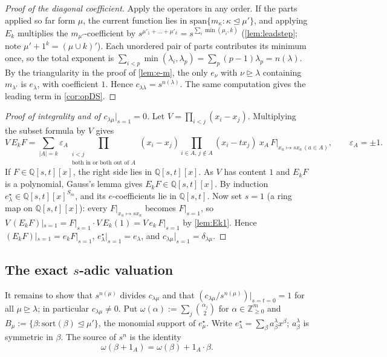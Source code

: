 \documentclass[11pt]{amsart}
\theoremstyle{definition}
\theoremstyle{remark}
\numberwithin{equation}{section}
\begin{document}
\begin{proof}[Proof of the diagonal coefficient]
Apply the operators in any order. If the parts applied so far form $\mu$, the current function lies in $\mathrm{span}\{m_\kappa:\kappa\trianglelefteq\mu'\}$, and applying $E_k$ multiplies the $m_{\mu'}$-coefficient by $s^{\mu'_1+\dots+\mu'_k}=s^{\sum_i\min(\mu_i,k)}$ (\cref{lem:leadstep}; note $\mu'+1^k=(\mu\cup k)'$). Each unordered pair of parts contributes its minimum once, so the total exponent is $\sum_{i<p}\min(\lambda_i,\lambda_p)=\sum_p(p-1)\lambda_p=n(\lambda)$. By the triangularity in the proof of \cref{lem:e-m}, the only $e_\nu$ with $\nu\trianglerighteq\lambda$ containing $m_{\lambda'}$ is $e_\lambda$, with coefficient $1$. Hence $c_{\lambda\lambda}=s^{n(\lambda)}$. The same computation gives the leading term in \cref{cor:opDS}.
\end{proof}

\begin{proof}[Proof of integrality and of $c_{\lambda\mu}|_{s=1}=0$]
Let $V=\prod_{i<j}(x_i-x_j)$. Multiplying the subset formula by $V$ gives
\[ V\,E_kF=\sum_{|A|=k}\varepsilon_A\prod_{\substack{i<j\\ \text{both in or both out of }A}}(x_i-x_j)\prod_{i\in A,\,j\notin A}(x_i-tx_j)\ x_A\,F|_{x_a\mapsto sx_a\,(a\in A)} ,\qquad\varepsilon_A=\pm1. \]
If $F\in\mathbb{Q}[s,t][x]$, the right side lies in $\mathbb{Q}[s,t][x]$. As $V$ has content $1$ and $E_kF$ is a polynomial, Gauss's lemma gives $E_kF\in\mathbb{Q}[s,t][x]$. By induction $e^\star_\lambda\in\mathbb{Q}[s,t][x]^{S_m}$, and its $e$-coefficients lie in $\mathbb{Q}[s,t]$. Now set $s=1$ (a ring map on $\mathbb{Q}[s,t][x]$): every $F|_{x_a\mapsto sx_a}$ becomes $F|_{s=1}$, so $V\,(E_kF)|_{s=1}=F|_{s=1}\cdot V\,E_k(1)=V\,e_k\,F|_{s=1}$ by \cref{lem:Ek1}. Hence $(E_kF)|_{s=1}=e_kF|_{s=1}$, $e^\star_\lambda|_{s=1}=e_\lambda$, and $c_{\lambda\mu}|_{s=1}=\delta_{\lambda\mu}$.
\end{proof}

\subsection{The exact $s$-adic valuation}
It remains to show that $s^{n(\mu)}$ divides $c_{\lambda\mu}$ and that $(c_{\lambda\mu}/s^{n(\mu)})|_{s=t=0}=1$ for all $\mu\trianglerighteq\lambda$; in particular $c_{\lambda\mu}\ne0$. Put $\omega(\alpha):=\sum_j\binom{\alpha_j}{2}$ for $\alpha\in\mathbb{Z}^m_{\ge0}$ and $B_\mu:=\{\beta:\mathrm{sort}(\beta)\trianglelefteq\mu'\}$, the monomial support of $e^\star_\mu$. Write $e^\star_\lambda=\sum_\beta a^\lambda_\beta x^\beta$; $a^\lambda_\beta$ is symmetric in $\beta$. The source of $s^{n}$ is the identity
\begin{equation}\label{eq:omega}
\omega(\beta+1_A)=\omega(\beta)+1_A\cdot\beta .
\end{equation}
\end{document}
